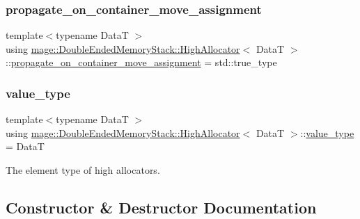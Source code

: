 \subsubsection{\texorpdfstring{propagate\+\_\+on\+\_\+container\+\_\+move\+\_\+assignment}{propagate\_on\_container\_move\_assignment}}
{\footnotesize\ttfamily template$<$typename DataT $>$ \\
using \hyperlink{classmage_1_1_double_ended_memory_stack_1_1_high_allocator}{mage\+::\+Double\+Ended\+Memory\+Stack\+::\+High\+Allocator}$<$ DataT $>$\+::\hyperlink{classmage_1_1_double_ended_memory_stack_1_1_high_allocator_a62088aeffb56b35539d9080aabc43134}{propagate\+\_\+on\+\_\+container\+\_\+move\+\_\+assignment} =  std\+::true\+\_\+type}

\hypertarget{classmage_1_1_double_ended_memory_stack_1_1_high_allocator_a43b87cea37b3bbba57ca794e9785e82d}{}\label{classmage_1_1_double_ended_memory_stack_1_1_high_allocator_a43b87cea37b3bbba57ca794e9785e82d} 
\subsubsection{\texorpdfstring{value\+\_\+type}{value\_type}}
{\footnotesize\ttfamily template$<$typename DataT $>$ \\
using \hyperlink{classmage_1_1_double_ended_memory_stack_1_1_high_allocator}{mage\+::\+Double\+Ended\+Memory\+Stack\+::\+High\+Allocator}$<$ DataT $>$\+::\hyperlink{classmage_1_1_double_ended_memory_stack_1_1_high_allocator_a43b87cea37b3bbba57ca794e9785e82d}{value\+\_\+type} =  DataT}

The element type of high allocators. 

\subsection{Constructor \& Destructor Documentation}
\hypertarget{classmage_1_1_double_ended_memory_stack_1_1_high_allocator_aaad727b10738064cffcb555252df5cfd}{}\label{classmage_1_1_double_ended_memory_stack_1_1_high_allocator_aaad727b10738064cffcb555252df5cfd} 
